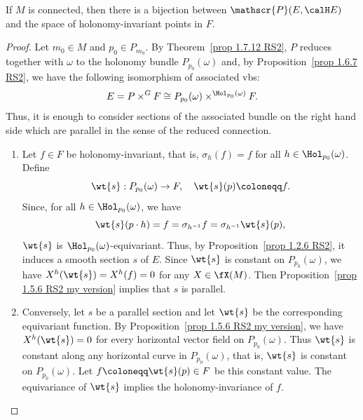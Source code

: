 \begin{prop}\label{prop 1.7.20 RS2 holonomy principle}
    If $M$ is connected, then there is a bijection between $\mathscr{P}(E,\calH E)$ and the space of holonomy-invariant points in $F$.
\end{prop}
\begin{proof}
    Let $m_0\in M$ and $p_0\in P_{m_0}$. By Theorem~\ref{prop 1.7.12 RS2}, $P$ reduces together with $\omega$ to the holonomy bundle $P_{p_0}(\omega)$ and, by Proposition~\ref{prop 1.6.7 RS2}, we have the following isomorphism of associated \glspl{vb}:
    \[E=P\times^G F\cong P_{p_0}(\omega)\times^{\Hol_{p_0}(\omega)}F.\]
    Thus, it is enough to consider sections of the associated bundle on the right hand side which are parallel in the sense of the reduced connection.
    \begin{enumerate}
        \item Let $f\in F$ be holonomy-invariant, that is, $\sigma_h(f)=f$ for all $h\in\Hol_{p_0}(\omega)$. Define
        \[\wt{s}:P_{p_0}(\omega)\to F,\quad \wt{s}(p)\coloneqq f.\]
        Since, for all $h\in \Hol_{p_0}(\omega)$, we have
        \[\wt{s}(p\cdot h)=f=\sigma_{h^{-1}}f=\sigma_{h^{-1}}\wt{s}(p),\]
        $\wt{s}$ is $\Hol_{p_0}(\omega)$-equivariant. Thus, by Proposition~\ref{prop 1.2.6 RS2}, it induces a smooth section $s$ of $E$. Since $\wt{s}$ is constant on $P_{p_0}(\omega)$, we have $X^h(\wt{s})=X^h(f)=0$ for any $X\in\fX(M)$. Then Proposition~\ref{prop 1.5.6 RS2 my version} implies that $s$ is parallel.
        \item Conversely, let $s$ be a parallel section and let $\wt{s}$ be the corresponding equivariant function. By Proposition~\ref{prop 1.5.6 RS2 my version}, we have $X^h(\wt{s})=0$ for every horizontal vector field on $P_{p_0}(\omega)$. Thus $\wt{s}$ is constant along any horizontal curve in $P_{p_0}(\omega)$, that is, $\wt{s}$ is constant on $P_{p_0}(\omega)$. Let $f\coloneqq \wt{s}(p)\in F$ be this constant value. The equivariance of $\wt{s}$ implies the holonomy-invariance of $f$.
    \end{enumerate}
\end{proof}





